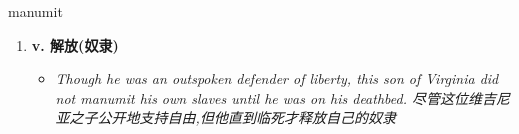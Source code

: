 
\begin{frame}
{\huge manumit}
\begin{center}
\begin{enumerate}\Large
  \item \textbf{v. 解放(奴隶)}
  \begin{itemize}
    \item \em{\Large{Though he was an outspoken defender of liberty, this son of Virginia did not manumit his own slaves until he was on his deathbed. 尽管这位维吉尼亚之子公开地支持自由,但他直到临死才释放自己的奴隶}}
  \end{itemize}
\end{enumerate}
\end{center}
\end{frame}
